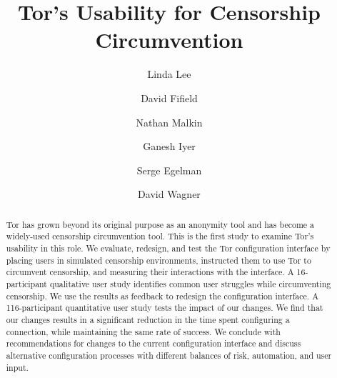 \documentclass[USenglish,oneside,twocolumn]{article}
\begin{document}
 
  \author*[1]{Linda Lee}

  \author[2]{David Fifield}

  \author[3]{Nathan Malkin}

  \author[4]{Ganesh Iyer}

  \author[5]{Serge Egelman}
  
  \author[6]{David Wagner}




  
   

  \title{\huge Tor's Usability for Censorship Circumvention}



  \begin{abstract}
{Tor has grown beyond its original purpose as an anonymity tool and has 
become a widely-used censorship circumvention tool.
This is the first study to examine Tor's usability in this role.
We evaluate, redesign, and test the Tor configuration interface by
placing users in simulated censorship environments, instructed them to use Tor
to circumvent censorship, and measuring their interactions with the interface.
A 16-participant qualitative user study identifies common user struggles while circumventing censorship.
We use the results as feedback to redesign the configuration interface.
A 116-participant quantitative user study tests the impact of our changes.
We find that our changes results in a significant reduction 
in the time spent configuring a connection, while maintaining the same rate of success. We
conclude with recommendations for changes to the current configuration interface and discuss
alternative configuration processes with different balances of risk, automation, and user input.}
\end{abstract}
\end{document}

